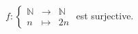 $f:\left\{\begin{array}{ccc}\mathbb{N} & \to & \mathbb{N} \\n & \mapsto & 2n\end{array}\right.$ est surjective.

\begin{reponses}
\end{reponses}

